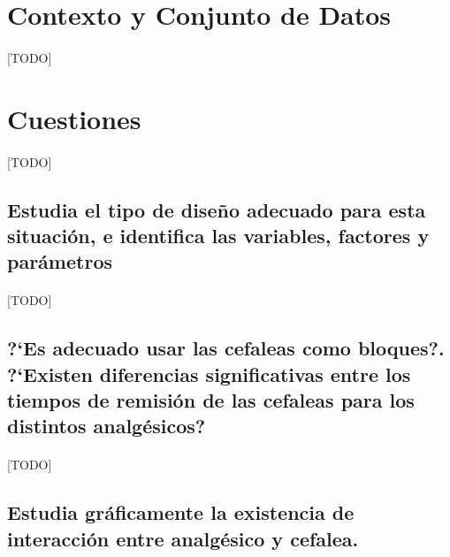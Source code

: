 \documentclass[11pt]{article}
\begin{document}
  \maketitle


  \section{Contexto y Conjunto de Datos}

    \paragraph{}
    [TODO]

  \section{Cuestiones}

    \paragraph{}
    [TODO]

    \subsection{Estudia el tipo de diseño adecuado para esta situación, e identifica las variables, factores y parámetros}

      \paragraph{}
      [TODO]

    \subsection{?`Es adecuado usar las cefaleas como bloques?. ?`Existen diferencias significativas entre los tiempos de remisión de las cefaleas para los distintos analgésicos?}

      \paragraph{}
      [TODO]

    \subsection{Estudia gráficamente la existencia de interacción entre analgésico y cefalea.}
\end{document}
